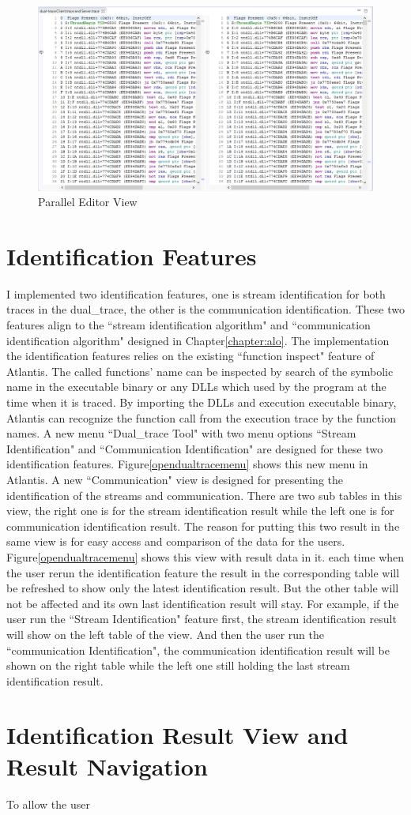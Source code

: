 \begin{figure}[H]
\centerline{\includegraphics[scale=0.48]{Figures/paralleleditor}}
 \caption{Parallel Editor View}
\label{paralleleditor}
\end{figure}



\section{Identification Features}
I implemented two identification features, one is stream identification for both traces in the dual\_trace, the other is the communication identification. These two features align to the ``stream identification algorithm" and ``communication identification algorithm" designed in Chapter\ref{chapter:alo}. The implementation the identification features relies on the existing ``function inspect" feature of Atlantis. The called functions' name can be inspected  by  search of the symbolic name in the executable binary or any DLLs which used by the program at the time when it is traced. By importing the DLLs and execution  executable binary, Atlantis can recognize the function call from the execution trace by the function names. A new menu ``Dual\_trace Tool" with two menu options ``Stream Identification" and ``Communication Identification" are designed for these two identification features. Figure\ref{opendualtracemenu} shows this new menu in Atlantis. A new  ``Communication" view is designed for presenting the identification of the streams and communication. There are two sub tables in this view, the right one is for the stream identification result while the left one is for communication identification result. The reason for putting this two result in the same view is for easy access and comparison of the data for the users. Figure\ref{opendualtracemenu} shows this view with result data in it. each time when the user rerun the identification feature the result in the corresponding table will be refreshed to show only the latest identification result. But the other table will not be affected and its own last identification result will stay. For example, if the user run the ``Stream Identification" feature first, the stream identification result will show on the left table of the view. And then the user run the ``communication Identification", the communication identification result will be shown on the right table while the left one still holding the last stream identification result.


\section{Identification Result View and Result Navigation}
To allow the user 


